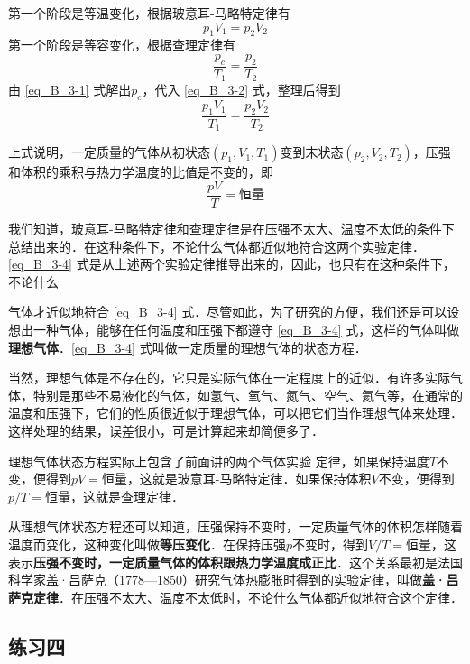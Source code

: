 第一个阶段是等温变化，根据玻意耳-马略特定律有
\begin{equation}\label{eq_B_3-1}
p_1V_1=p_2V_2
\end{equation}
第一个阶段是等容变化，根据查理定律有
\begin{equation}\label{eq_B_3-2}
\frac{p_c}{T_1}=\frac{p_2}{T_2}
\end{equation}
由 \eqref{eq_B_3-1} 式解出$p_c$，代入 \eqref{eq_B_3-2} 式，整理后得到
\begin{equation}\label{eq_B_3-3}
\frac{p_1V_1}{T_1}=\frac{p_2V_2}{T_2}
\end{equation}

上式说明，一定质量的气体从初状态$(p_1,V_1,T_1)$变到末状态$(p_2,V_2,T_2)$，压强和体积的乘积与热力学温度的比值是不变的，即
\begin{equation}\label{eq_B_3-4}
\frac{pV}{T}=\text{恒量}
\end{equation}

我们知道，玻意耳-马略特定律和查理定律是在压强不太大、温度不太低的条件下总结出来的．在这种条件下，不论什么气体都近似地符合这两个实验定律．\eqref{eq_B_3-4} 式是从上述两个实验定律推导出来的，因此，也只有在这种条件下，不论什么

气体才近似地符合 \eqref{eq_B_3-4} 式．尽管如此，为了研究的方便，我们还是可以设想出一种气体，能够在任何温度和压强下都遵守 \eqref{eq_B_3-4}  式，这样的气体叫做\textbf{理想气体}．\eqref{eq_B_3-4} 式叫做一定质量的理想气体的状态方程．

当然，理想气体是不存在的，它只是实际气体在一定程度上的近似．有许多实际气体，特别是那些不易液化的气体，如氢气、氧气、氮气、空气、氦气等，在通常的温度和压强下，它们的性质很近似于理想气体，可以把它们当作理想气体来处理．这样处理的结果，误差很小，可是计算起来却简便多了．

理想气体状态方程实际上包含了前面讲的两个气体实验
定律，如果保持温度$T$不变，便得到$pV=\text{恒量}$，这就是玻意耳-马略特定律．如果保持体积$V$不变，便得到$p/T=\text{恒量}$，这就是查理定律．

从理想气体状态方程还可以知道，压强保持不变时，一定质量气体的体积怎样随着温度而变化，这种变化叫做\textbf{等压变化}．在保持压强$p$不变时，得到$V/T=\text{恒量}$，这表示\textbf{压强不变时，一定质量气体的体积跟热力学温度成正比}．这个关系最初是法国科学家盖·吕萨克（1778—1850）研究气体热膨胀时得到的实验定律，叫做\textbf{盖·吕萨克定律}．在压强不太大、温度不太低时，不论什么气体都近似地符合这个定律．


\subsection*{练习四}

